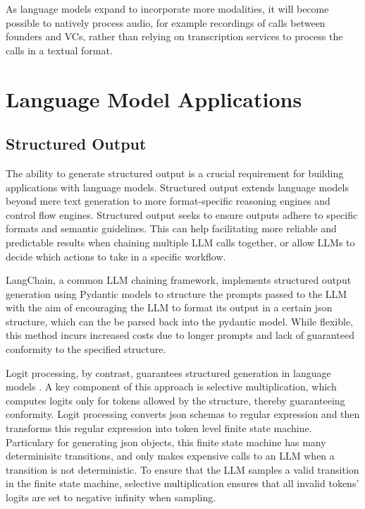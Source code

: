 \documentclass[a4paper, oneside]{discothesis}
\begin{document}
As language models expand to incorporate more modalities, it will become possible to natively process audio, for example recordings of calls between founders and VCs, rather than relying on transcription services to process the calls in a textual format. 

\section{Language Model Applications}

\subsection{Structured Output}
The ability to generate structured output is a crucial requirement for building applications with language models. Structured output extends language models beyond mere text generation to more format-specific reasoning engines and control flow engines. Structured output seeks to ensure outputs adhere to specific formats and semantic guidelines. This can help facilitating more reliable and predictable results when chaining multiple LLM calls together,  or allow LLMs to decide which actions to take in a specific workflow.

LangChain, a common LLM chaining framework, implements structured output generation using Pydantic models to structure the prompts passed to the LLM with the aim of encouraging the LLM to format its output in a certain json structure, which can the be parsed back into the pydantic model. While flexible, this method incurs increased costs due to longer prompts and lack of guaranteed conformity to the specified structure.

Logit processing, by contrast, guarantees structured generation in language models \cite{chaudhari2023logit}. A key component of this approach is selective multiplication, which computes logits only for tokens allowed by the structure, thereby guaranteeing conformity. Logit processing converts json schemas to regular expression and then transforms this regular expression into token level finite state machine. Particulary for generating json objects, this finite state machine has many determinisitc transitions, and only makes expensive calls to an LLM when a transition is not deterministic. To ensure that the LLM samples a valid transition in the finite state machine, selective multiplication ensures that all invalid tokens' logits are set to negative infinity when sampling.
\end{document}
